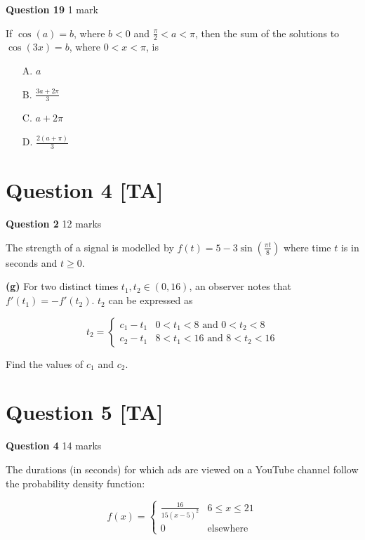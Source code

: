 \documentclass[10pt,a4paper]{article}
\begin{document}
\textbf{Question 19} \hfill 1 mark

If $\cos(a) = b$, where $b < 0$ and $\frac{\pi}{2} < a < \pi$, then the sum of the solutions to $\cos(3x) = b$, where $0 < x < \pi$, is

\begin{enumerate}
    \item[A.] $a$
    \item[B.] $\frac{3a + 2\pi}{3}$
    \item[C.] $a + 2\pi$
    \item[D.] $\frac{2(a + \pi)}{3}$
\end{enumerate}

\vspace{9\baselineskip}

\hrulefill

\section*{Question 4 [TA]}

\textbf{Question 2} \hfill 12 marks

The strength of a signal is modelled by $f(t) = 5 - 3\sin\left(\frac{\pi t}{8}\right)$ where time $t$ is in seconds and $t \geq 0$.

\textbf{(g)} For two distinct times $t_1, t_2 \in (0, 16)$, an observer notes that $f'(t_1) = -f'(t_2)$. $t_2$ can be expressed as

\[
t_2 = \begin{cases}
c_1 - t_1 & 0 < t_1 < 8 \text{ and } 0 < t_2 < 8 \\
c_2 - t_1 & 8 < t_1 < 16 \text{ and } 8 < t_2 < 16
\end{cases}
\]

Find the values of $c_1$ and $c_2$.

\vspace{9\baselineskip}

\hrulefill

\section*{Question 5 [TA]}

\textbf{Question 4} \hfill 14 marks

The durations (in seconds) for which ads are viewed on a YouTube channel follow the probability density function:

\[
f(x) = \begin{cases}
\frac{16}{15(x-5)^2} & 6 \leq x \leq 21 \\
0 & \text{elsewhere}
\end{cases}
\]
\end{document}
